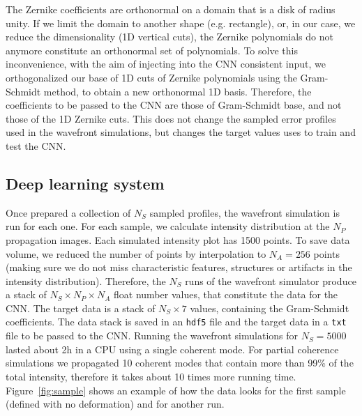 \documentclass{iucr}
\begin{document}
The Zernike coefficients are orthonormal on a domain that is a disk of radius unity. If we limit the domain to another shape (e.g. rectangle), or, in our case, we reduce the dimensionality (1D vertical cuts), the Zernike polynomials do not anymore constitute an orthonormal set of polynomials. To solve this inconvenience, with the aim of injecting into the CNN consistent input, we orthogonalized our base of 1D cuts of Zernike polynomials using the Gram-Schmidt method, to obtain a new orthonormal 1D basis. Therefore, the coefficients to be passed to the CNN are those of Gram-Schmidt base, and not those of the 1D Zernike cuts. This does not change the sampled error profiles used in the wavefront simulations, but changes the target values uses to train and test the CNN.  


\subsection{Deep learning system}

Once prepared a collection of $N_S$ sampled profiles, the wavefront simulation is run for each one. For each sample,  we calculate intensity distribution at the $N_P$ propagation images. Each simulated intensity plot has 1500 points. To save data volume, we reduced the number of points by interpolation to $N_A=256$ points (making sure we do not miss characteristic features, structures or artifacts in the intensity distribution). Therefore, the $N_S$ runs of the wavefront simulator produce a stack of $N_S \times N_P \times N_A$ float number values, that constitute the data for the CNN. The target data is a stack of $N_S \times 7$ values, containing the Gram-Schmidt coefficients. The data stack is saved in an \texttt{hdf5} file and the target data in a \texttt{txt} file to be passed to the CNN. Running the wavefront simulations for $N_S=5000$ lasted about 2h in a CPU using a single coherent mode. For partial coherence simulations we propagated 10 coherent modes that contain more than 99\% of the total intensity, therefore it takes about 10 times more running time. Figure~\ref{fig:sample} shows an example of how the data looks for the first sample (defined with no deformation) and for another run.
\end{document}
